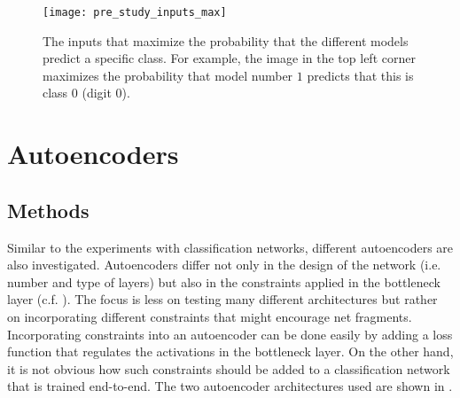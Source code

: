 \begin{figure}[h]
    \centering
    \texttt{[image: pre\_study\_inputs\_max]}
    \caption[Inputs that Maximize the Class Output Probability]{The inputs that maximize the probability that the different models predict a specific class. For example, the image in the top left corner maximizes the probability that model number $1$ predicts that this is class $0$ (digit $0$).}
\end{figure}



\section{Autoencoders}

\subsection{Methods}
Similar to the experiments with classification networks, different autoencoders are also investigated.
Autoencoders differ not only in the design of the network (i.e. number and type of layers) but also in the constraints applied in the bottleneck layer (c.f. ).
The focus is less on testing many different architectures but rather on incorporating different constraints that might encourage net fragments.
Incorporating constraints into an autoencoder can be done easily by adding a loss function that regulates the activations in the bottleneck layer.
On the other hand, it is not obvious how such constraints should be added to a classification network that is trained end-to-end.
The two autoencoder architectures used are shown in .


